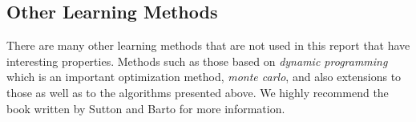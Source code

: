 \documentclass[result.tex]{subfiles}
\begin{document}
    \subsection*{Other Learning Methods}

    There are many other learning methods that are not used in this report that have interesting properties. Methods such as those based on \textit{dynamic programming} which is an important optimization method, \textit{monte carlo}, and also extensions to those as well as to the algorithms presented above. We highly recommend the book written by Sutton and Barto \cite{sutton1998reinforcement} for more information.
\end{document}
